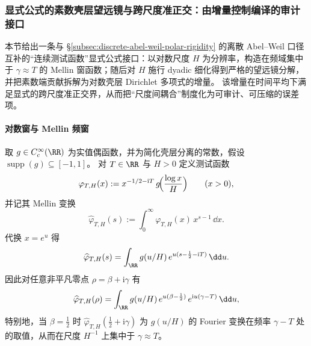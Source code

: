 \subsubsection{显式公式的素数壳层望远镜与跨尺度准正交：由增量控制编译的审计接口}\label{subsubsec:xi-prime-shell-telescope-quasi-orthogonality}
本节给出一条与 \S\ref{subsec:discrete-abel-weil-polar-rigidity} 的离散 Abel--Weil 口径互补的“连续测试函数”显式公式接口：以对数尺度 \(H\) 为分辨率，构造在频域集中于 \(\gamma\approx T\) 的 Mellin 窗函数；随后对 \(H\) 施行 dyadic 细化得到严格的望远镜分解，并把素数端贡献拆解为对数壳层 Dirichlet 多项式的增量。
该增量在时间平均下满足显式的跨尺度准正交界，从而把“尺度间耦合”制度化为可审计、可压缩的误差项。

\paragraph{对数窗与 Mellin 频窗}
取 \(g\in C_c^\infty(\RR)\) 为实值偶函数，并为简化壳层分离的常数，假设 \(\operatorname{supp}(g)\subseteq[-1,1]\)。
对 \(T\in\RR\) 与 \(H>0\) 定义测试函数
\begin{equation}\label{eq:xi-prime-shell-test-function}
\varphi_{T,H}(x):=x^{-1/2-\mathrm{i}T}\,g\!\Bigl(\frac{\log x}{H}\Bigr)\qquad(x>0),
\end{equation}
并记其 Mellin 变换
\[
\widehat{\varphi}_{T,H}(s):=\int_{0}^{\infty}\varphi_{T,H}(x)\,x^{s-1}\,\dd x.
\]
代换 \(x=e^{u}\) 得
\begin{equation}\label{eq:xi-prime-shell-mellin-transform-window}
\widehat{\varphi}_{T,H}(s)=\int_{\RR} g(u/H)\,e^{u(s-\frac12-\mathrm{i}T)}\,\dd u.
\end{equation}
因此对任意非平凡零点 \(\rho=\beta+\mathrm{i}\gamma\) 有
\begin{equation}\label{eq:xi-prime-shell-mellin-at-zero}
\widehat{\varphi}_{T,H}(\rho)
=\int_{\RR} g(u/H)\,e^{u(\beta-\frac12)}\,e^{\mathrm{i}u(\gamma-T)}\,\dd u,
\end{equation}
特别地，当 \(\beta=\tfrac12\) 时 \(\widehat{\varphi}_{T,H}(\tfrac12+\mathrm{i}\gamma)\) 为 \(g(u/H)\) 的 Fourier 变换在频率 \(\gamma-T\) 处的取值，从而在尺度 \(H^{-1}\) 上集中于 \(\gamma\approx T\)。

